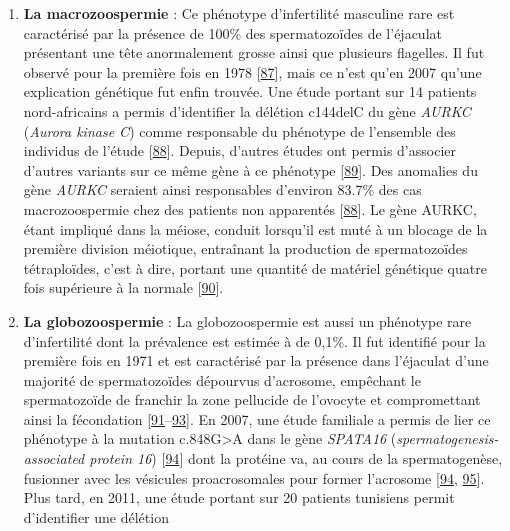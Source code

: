 \documentclass[12pt,a4paper,twoside]{ugathesis}
\providecommand{\tightlist}{%
  \setlength{\itemsep}{0pt}\setlength{\parskip}{0pt}}
\theoremstyle{definition}
\theoremstyle{definition}
\theoremstyle{definition}
\theoremstyle{remark}
\begin{document}
\begin{enumerate}
  \begin{enumerate}
  \def\labelenumii{\alph{enumii}.}
  \tightlist
  \item
    \textbf{La macrozoospermie} : Ce phénotype d'infertilité masculine
    rare est caractérisé par la présence de 100\% des spermatozoïdes de
    l'éjaculat présentant une tête anormalement grosse ainsi que
    plusieurs flagelles. Il fut observé pour la première fois en 1978
    {[}\protect\hyperlink{ref-Nistal}{87}{]}, mais ce n'est qu'en 2007
    qu'une explication génétique fut enfin trouvée. Une étude portant
    sur 14 patients nord-africains a permis d'identifier la délétion
    c144delC du gène \emph{AURKC} (\emph{Aurora kinase C}) comme
    responsable du phénotype de l'ensemble des individus de l'étude
    {[}\protect\hyperlink{ref-Dieterich2007}{88}{]}. Depuis, d'autres
    études ont permis d'associer d'autres variants sur ce même gène à ce
    phénotype {[}\protect\hyperlink{ref-BenKhelifa2011}{89}{]}. Des
    anomalies du gène \emph{AURKC} seraient ainsi responsables d'environ
    83.7\% des cas macrozoospermie chez des patients non apparentés
    {[}\protect\hyperlink{ref-Dieterich2007}{88}{]}. Le gène AURKC,
    étant impliqué dans la méiose, conduit lorsqu'il est muté à un
    blocage de la première division méiotique, entraînant la production
    de spermatozoïdes tétraploïdes, c'est à dire, portant une quantité
    de matériel génétique quatre fois supérieure à la normale
    {[}\protect\hyperlink{ref-Dieterich2009}{90}{]}.\\
  \item
    \textbf{La globozoospermie} : La globozoospermie est aussi un
    phénotype rare d'infertilité dont la prévalence est estimée à de
    0,1\%. Il fut identifié pour la première fois en 1971 et est
    caractérisé par la présence dans l'éjaculat d'une majorité de
    spermatozoïdes dépourvus d'acrosome, empêchant le spermatozoïde de
    franchir la zone pellucide de l'ovocyte et compromettant ainsi la
    fécondation
    {[}\protect\hyperlink{ref-Dam2006}{91}--\protect\hyperlink{ref-Holstein1973}{93}{]}.
    En 2007, une étude familiale a permis de lier ce phénotype à la
    mutation c.848G\textgreater{}A dans le gène \emph{SPATA16}
    (\emph{spermatogenesis-associated protein 16})
    {[}\protect\hyperlink{ref-Dam2007a}{94}{]} dont la protéine va, au
    cours de la spermatogenèse, fusionner avec les vésicules
    proacrosomales pour former l'acrosome
    {[}\protect\hyperlink{ref-Dam2007a}{94},
    \protect\hyperlink{ref-Lu2006}{95}{]}. Plus tard, en 2011, une étude
    portant sur 20 patients tunisiens permit d'identifier une délétion

\end{enumerate}
\end{enumerate}
\end{document}

